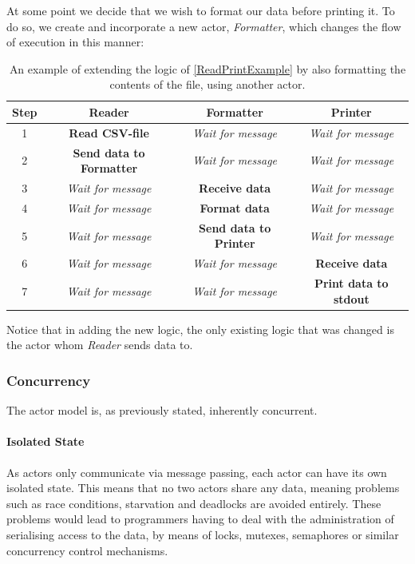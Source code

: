 At some point we decide that we wish to format our data before printing it. To do so, we create and incorporate a new actor, \emph{Formatter}, which changes the flow of execution in this manner:\\

\begin{table}
\begin{tabular}{ | c | c | c | c | }
\hline
Step & Reader & Formatter & Printer \\\hline
1 & \textbf{Read CSV-file} & \textit{Wait for message} & \textit{Wait for message} \\\hline
2 & \textbf{Send data to Formatter} & \textit{Wait for message} & \textit{Wait for message}\\\hline
3 & \textit{Wait for message} & \textbf{Receive data} & \textit{Wait for message} \\\hline
4 & \textit{Wait for message} & \textbf{Format data} & \textit{Wait for message} \\\hline
5 & \textit{Wait for message} & \textbf{Send data to Printer} & \textit{Wait for message} \\\hline
6 & \textit{Wait for message} & \textit{Wait for message} & \textbf{Receive data}\\\hline
7 & \textit{Wait for message} & \textit{Wait for message} & \textbf{Print data to stdout} \\\hline
\end{tabular}
\caption{An example of extending the logic of \cref{ReadPrintExample} by also formatting the contents of the file, using another actor.}
\end{table}

Notice that in adding the new logic, the only existing logic that was changed is the actor whom \emph{Reader} sends data to.

\subsubsection{Concurrency}
The actor model is, as previously stated, inherently concurrent.

\paragraph{Isolated State}
As actors only communicate via message passing, each actor can have its own isolated state. This means that no two actors share any data, meaning problems such as race conditions, starvation and deadlocks are avoided entirely. These problems would lead to programmers having to deal with the administration of serialising access to the data, by means of locks, mutexes, semaphores or similar concurrency control mechanisms.

